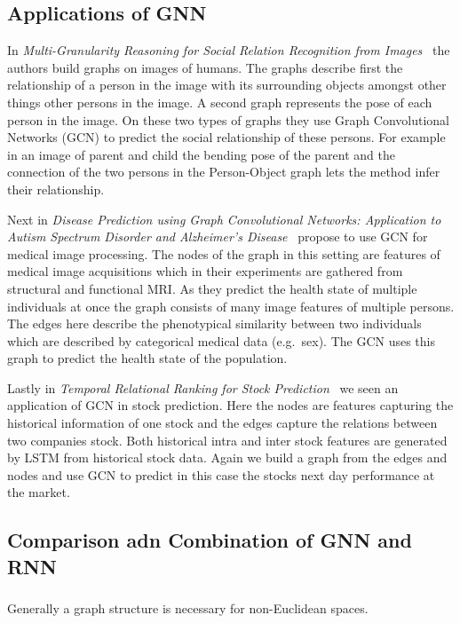 \documentclass{article}
\begin{document}
\subsection{Applications of GNN}
In \textit{Multi-Granularity Reasoning for Social Relation Recognition from Images}~\cite{zhang2019} the authors build graphs on images of humans.
The graphs describe first the relationship of a person in the image with its surrounding objects amongst other things other persons in the image.
A second graph represents the pose of each person in the image.
On these two types of graphs they use Graph Convolutional Networks (GCN) to predict the social relationship of these persons.
For example in an image of parent and child the bending pose of the parent and the connection of the two persons in the Person-Object graph lets the method infer their relationship.

Next in \textit{Disease Prediction using Graph Convolutional Networks: Application to Autism Spectrum Disorder and Alzheimer's Disease}~\cite{parisot2018} propose to use GCN for medical image processing.
The nodes of the graph in this setting are features of medical image acquisitions which in their experiments are gathered from structural and functional MRI.
As they predict the health state of multiple individuals at once the graph consists of many image features of multiple persons.
The edges here describe the phenotypical similarity between two individuals which are described by categorical medical data (e.g.\ sex).
The GCN uses this graph to predict the health state of the population.


Lastly in \textit{Temporal Relational Ranking for Stock Prediction}~\cite{feng2019} we seen an application of GCN in stock prediction.
Here the nodes are features capturing the historical information of one stock and the edges capture the relations between two companies stock.
Both historical intra and inter stock features are generated by LSTM from historical stock data.
Again we build a graph from the edges and nodes and use GCN to predict in this case the stocks next day performance at the market.

\subsection{Comparison adn Combination of GNN and RNN}
\subsubsection{}
Generally a graph structure is necessary for non-Euclidean spaces.
\subsubsection{}



\end{document}
